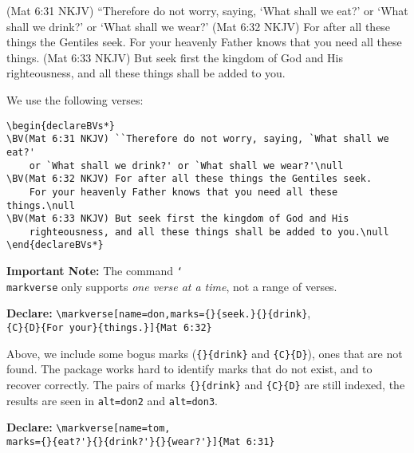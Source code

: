 \documentclass{article}
\def\cs#1{\texttt{\char`\\#1}}
\begin{document}
\begin{declareBVs*}
\BV(Mat 6:31 NKJV) ``Therefore do not worry, saying, `What shall we eat?'
    or `What shall we drink?' or `What shall we wear?'\null
\BV(Mat 6:32 NKJV) For after all these things the Gentiles seek.
    For your heavenly Father knows that you need all these things.\null
\BV(Mat 6:33 NKJV) But seek first the kingdom of God and His righteousness,
    and all these things shall be added to you.\null
\end{declareBVs*}

\noindent We use the following verses:
\begin{Verbatim}[fontsize=\small]
\begin{declareBVs*}
\BV(Mat 6:31 NKJV) ``Therefore do not worry, saying, `What shall we eat?'
    or `What shall we drink?' or `What shall we wear?'\null
\BV(Mat 6:32 NKJV) For after all these things the Gentiles seek.
    For your heavenly Father knows that you need all these things.\null
\BV(Mat 6:33 NKJV) But seek first the kingdom of God and His
    righteousness, and all these things shall be added to you.\null
\end{declareBVs*}
\end{Verbatim}

\parindent0pt \parskip6pt

\textbf{Important Note:} The command \cs{markverse} only supports
\emph{one verse at a time}, not a range of verses.

\textbf{Declare:} \verb!\markverse[name=don,marks={}{seek.}{}{drink}!,\\
\null\qquad\qquad\verb!{C}{D}{For your}{things.}]{Mat 6:32}!

Above, we include some bogus marks (\verb~{}{drink}~ and \verb~{C}{D}~), ones
that are not found. The package works hard to identify marks that do not
exist, and to recover correctly. The pairs of marks \verb~{}{drink}~ and
\verb~{C}{D}~ are still indexed, the results are seen in \texttt{alt=don2}
and \texttt{alt=don3}.






\textbf{Declare:} \verb~\markverse[name=tom,~\\
\null\qquad\qquad\qquad\verb~marks={}{eat?'}{}{drink?'}{}{wear?'}]{Mat 6:31}~
\end{document}
